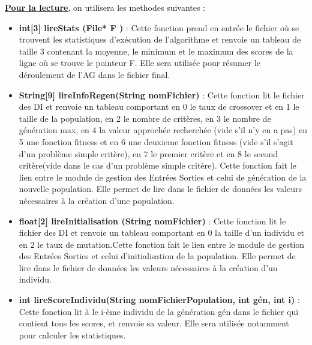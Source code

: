 \documentclass[a4paper,11pt]{article}
\begin{document}
			\underline{\bf Pour la lecture}, on utilisera les methodes suivantes :\\
			\begin{itemize}
				\item \textbf{int[3] lireStats (File* F )} : Cette fonction prend en entrée le fichier où se trouvent les statistiques d’exécution de l’algorithme et renvoie un tableau de taille 3 contenant la moyenne, le minimum et le maximum des scores de la ligne où se trouve le pointeur F. Elle sera utilisée pour résumer le déroulement de l'AG dans le fichier final.\vspace{0.2cm}

				\item \textbf{String[9] lireInfoRegen(String nomFichier)} : Cette fonction lit le fichier des DI et renvoie un tableau comportant en 0 le taux de crossover et en 1 le taille de la population, en 2 le nombre de critères, en 3 le nombre de génération max, en 4 la valeur approchée recherchée (vide s'il n'y en a pas) en 5 une fonction fitness et en 6 une deuxieme fonction fitness (vide s'il s'agit d'un problème simple critère), en 7 le premier critère et en 8 le second critère(vide dans le cas d'un problème simple critère).
					Cette fonction fait le lien entre le module de gestion des Entrées Sorties et celui de génération de la nouvelle population.
					Elle permet de lire dans le fichier de données les valeurs nécessaires à la création d’une population.\vspace{0.2cm}
				\item \textbf{float[2] lireInitialisation (String nomFichier)} : Cette fonction lit le fichier des DI et renvoie un tableau comportant en 0 la taille d’un individu et en 2 le taux de mutation.Cette fonction fait le lien entre le module de gestion des Entrées Sorties et celui d’initialisation de la population. 
					Elle permet de lire dans le fichier de données les valeurs nécessaires à la création d’un individu.\vspace{0.2cm}

				\item \textbf{int lireScoreIndividu(String nomFichierPopulation, int gén, int i)} : Cette fonction lit à le i-ème individu de la génération gén dans le fichier qui contient tous les scores, et renvoie sa valeur. Elle sera utilisée notamment pour calculer les statistiques.\\

			\end{itemize}
			
\end{document}
